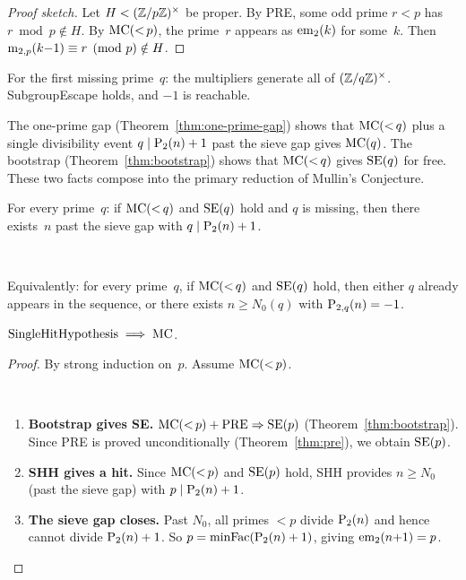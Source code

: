 \begin{proof}[Proof sketch]
Let $H < (\mathbb{Z}/p\mathbb{Z})^\times$ be proper.  By PRE, some odd prime
$r < p$ has $r \bmod p \notin H$.  By $\mathrm{MC}({<}\,p)$, the prime~$r$
appears as $\mathrm{em}_{2}(k)$ for some~$k$.  Then $\mathrm{m}_{2,p}(k{-}1) \equiv r
\pmod{p} \notin H$.
\end{proof}

\begin{corollary}\label{cor:fmp-se}
For the first missing prime~$q$: the multipliers generate all of
$(\mathbb{Z}/q\mathbb{Z})^\times$.  SubgroupEscape holds, and $-1$ is reachable.
\end{corollary}

The one-prime gap (Theorem~\ref{thm:one-prime-gap}) shows that
$\mathrm{MC}({<}\,q)$ plus a single divisibility event $q \mid \mathrm{P}_{2}(n)+1$
past the sieve gap gives $\mathrm{MC}(q)$.  The bootstrap
(Theorem~\ref{thm:bootstrap}) shows that $\mathrm{MC}({<}\,q)$ gives $\mathrm{SE}(q)$
for free.  These two facts compose into the primary reduction of
Mullin's Conjecture.

\begin{property}\label{def:shh}
For every prime~$q$: if $\mathrm{MC}({<}\,q)$ and $\mathrm{SE}(q)$ hold and $q$ is
missing, then there exists~$n$ past the sieve gap with
$q \mid \mathrm{P}_{2}(n)+1$.

\

\noindent Equivalently: for every prime~$q$, if $\mathrm{MC}({<}\,q)$ and $\mathrm{SE}(q)$
hold, then either $q$ already appears in the sequence, or there
exists $n \geq N_0(q)$ with $\mathrm{P}_{2,q}(n) = -1$.
\end{property}

\begin{theorem}
\label{thm:single-hit}
$\mathrm{SingleHitHypothesis} \;\Longrightarrow\; \mathrm{MC}$.
\end{theorem}

\begin{proof}
By strong induction on~$p$.  Assume $\mathrm{MC}({<}\,p)$.

\

\begin{enumerate}[nosep]
\item \textbf{Bootstrap gives SE\@.}
    $\mathrm{MC}({<}\,p) + \mathrm{PRE} \Rightarrow \mathrm{SE}(p)$ (Theorem~\ref{thm:bootstrap}).
    Since PRE is proved unconditionally (Theorem~\ref{thm:pre}), we
    obtain $\mathrm{SE}(p)$.

\item \textbf{SHH gives a hit.}
    Since $\mathrm{MC}({<}\,p)$ and $\mathrm{SE}(p)$ hold, SHH provides
    $n \geq N_0$ (past the sieve gap) with $p \mid \mathrm{P}_{2}(n)+1$.

\item \textbf{The sieve gap closes.}
    Past $N_0$, all primes $< p$ divide $\mathrm{P}_{2}(n)$ and hence cannot
    divide $\mathrm{P}_{2}(n)+1$.  So $p = \mathrm{minFac}(\mathrm{P}_{2}(n)+1)$, giving
    $\mathrm{em}_{2}(n{+}1) = p$.
\end{enumerate}
\end{proof}

